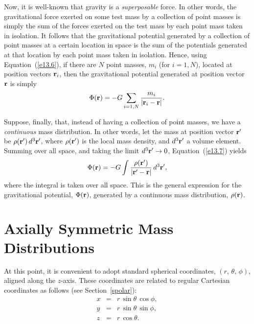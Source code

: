 Now, it is well-known that gravity is a {\em superposable}\/ force. In other
words, the gravitational force exerted on some test mass by a collection
of point masses is simply the sum of the forces exerted on the test mass
by each point mass taken in isolation. It follows that
the gravitational potential generated by a collection of point masses
at a certain location in space is the sum of the potentials generated at that
location by each point mass taken in isolation. Hence, using Equation~(\ref{e13.6}), if there are $N$
point masses, $m_i$ (for $i=1, N$), located at position vectors ${\bf r}_i$,
then the gravitational potential generated at position vector ${\bf r}$ is simply
\begin{equation}\label{e13.7}
\Phi({\bf r}) = - G\sum_{i=1,N} \frac{m_i}{|{\bf r}_i-{\bf r}|}.
\end{equation}

Suppose, finally, that, instead of having a collection of point masses, we have
a {\em continuous}\/ mass distribution. In other words, let the mass at position
vector ${\bf r}'$ be $\rho({\bf r}')\,d^3{\bf r}'$, where $\rho({\bf r}')$
is the local mass density, and $d^3{\bf r}'$  a volume element. 
Summing over all space, and taking the limit $d^3{\bf r}'\rightarrow 0$,
Equation~(\ref{e13.7}) yields
\begin{equation}\label{e13.8}
\Phi({\bf r}) = - G\int\frac{\rho({\bf r}')}{|{\bf r}'-{\bf r}|}\,d^3{\bf r}',
\end{equation}
where the integral is taken over all space.
This is the general expression for the gravitational potential, $\Phi({\bf r})$, generated by
a continuous mass distribution, $\rho({\bf r})$.

\section{Axially Symmetric Mass Distributions}\label{saxial}
At this point, it is convenient to adopt standard spherical  coordinates, $(r,\, \theta,\, \phi)$, aligned along the $z$-axis. These coordinates are related to
regular Cartesian coordinates as follows (see Section~\ref{spolar}):
\begin{eqnarray}\label{e13.9}
x &=& r\,\sin\theta\,\cos\phi,\\[0.5ex]
y &=&r\,\sin\theta\,\sin\phi,\\[0.5ex]
z &=& r\,\cos\theta.\label{e13.11}
\end{eqnarray}

